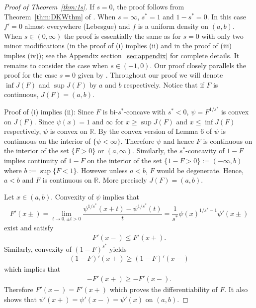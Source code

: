 \documentclass[11pt]{amsart}
\numberwithin{equation}{section}
\newcommand{\RR}{\mathbb{R}}
\def\st{\ensuremath{s^*}}
\theoremstyle{definition}\newtheorem{definition}{Definition}
\theoremstyle{remark}\newtheorem{assumption}{Assumption}
\theoremstyle{remark}\newtheorem{remark}{Remark}
\theoremstyle{definition}\newtheorem{example}{Example}
\theoremstyle{plain}\newtheorem{question}{Question}
\theoremstyle{plain}\newtheorem{theorem}{Theorem}
\theoremstyle{plain}\newtheorem{lemma}{Lemma}
\theoremstyle{plain}\newtheorem{proposition}{Proposition}
\theoremstyle{plain}\newtheorem{corollary}{Corollary}
\theoremstyle{plain}\newtheorem{conjecture}{Conjecture}
\begin{document}
\par\noindent
\begin{proof}[Proof of Theorem~\ref{thm:1s}]
If $s=0$, the proof follows from Theorem~\ref{thm:DKWthm} of \cite{DuembgenKW:2017}.  
When $s=\infty$, $s^*=1$ and $1-s^* = 0$.  In this case $f'=0$ almost everywhere (Lebesgue) and 
$f$ is a uniform density on $(a,b)$.  When $s \in (0,\infty)$ the proof is essentially the same as for $s=0$
with only two minor modifications (in the proof of (i) implies (ii) and in the proof of (iii) implies (iv));  
see the Appendix section~\ref{sec:appendix} for complete 
details.
It remains to consider the case 
when $s\in(-1,0)$.  Our proof closely parallels the proof 
for the case $s=0$ given by  \cite{DuembgenKW:2017}.
Throughout our proof we will denote $\inf J(F)$ and $\sup J(F)$ by $a$ and $b$ 
respectively. Notice that if $F$ is continuous, $J(F)=(a,b).$

  Proof of (i) implies (ii):
 Since $F$ is bi-$s^*$-concave with $s^{*}<0$, $\psi=F^{1/\st}$ is convex on $J(F)$. 
 Since $\psi(x)=1$ and $\infty$ for $x\geq\sup J(F)$ and $x\le\inf J(F)$ respectively,  $\psi$
 is convex on $\RR.$ By the convex version of Lemma $6$ of \cite{DuembgenKW:2017} 
  $\psi$ is continuous on the interior of $\{\psi<\infty\}.$ Therefore $\psi$ and hence $F$ is continuous 
  on the interior of the set $\{F>0\}$ or $(a,\infty)$. 
  Similarly, the $s^*$-concavity of $1-F$ 
  implies continuity of $1-F$ on the interior of the set $\{1-F>0\}:=(-\infty,b)$ where 
  $b:=\sup\{F<1\}$.  
  However unless $a<b$, $F$ would be degenerate. Hence, $a<b$ and $F$ is continuous on $\RR$. 
  More precisely $J(F)=(a,b)$.  
  
 Let $x\in(a,b)$. Convexity of $\psi$ implies that 
  \begin{eqnarray*}
  F'(x\pm)=\lim_{t\to 0,\pm t>0}\dfrac{\psi^{1/s^*}(x+t)-\psi^{1/s^*}(t)}{t}=\dfrac{1}{s^*}\psi(x)^{1/s^*-1}\psi'(x\pm)
  \end{eqnarray*}
  exist and satisfy
  \begin{eqnarray*}
  F'(x-) \le F'(x+) .
  \end{eqnarray*}
 Similarly, convexity of $(1-F)^{s^*}$ yields 
  \begin{eqnarray*}
  (1-F)'(x+)\geq (1-F)'(x-)
  \end{eqnarray*}
  which implies that
  \begin{eqnarray*}
  -F'(x+)\geq -F'(x-).
  \end{eqnarray*}
Therefore $F'(x-)=F'(x+)$ which proves the differentiability of $F$. 
It also shows that $\psi'(x+)=\psi'(x-)=\psi'(x)$ on $(a,b)$.
  

\end{proof}
\end{document}
